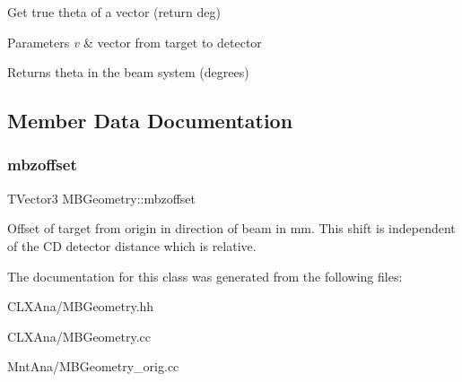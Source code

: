 Get true theta of a vector (return deg) 
\begin{DoxyParams}{Parameters}
{\em v} & vector from target to detector \\
\hline
\end{DoxyParams}
\begin{DoxyReturn}{Returns}
theta in the beam system (degrees) 
\end{DoxyReturn}


\subsection{Member Data Documentation}
\mbox{\label{class_m_b_geometry_a687268aeee7a0e2edc0486a76a07affe}} 
\subsubsection{\texorpdfstring{mbzoffset}{mbzoffset}}
{\footnotesize\ttfamily T\+Vector3 M\+B\+Geometry\+::mbzoffset\hspace{0.3cm}{\ttfamily [private]}}

Offset of target from origin in direction of beam in mm. This shift is independent of the CD detector distance which is relative. 

The documentation for this class was generated from the following files\+:\begin{DoxyCompactItemize}
\item 
C\+L\+X\+Ana/M\+B\+Geometry.\+hh\item 
C\+L\+X\+Ana/M\+B\+Geometry.\+cc\item 
Mnt\+Ana/M\+B\+Geometry\+\_\+orig.\+cc\end{DoxyCompactItemize}

